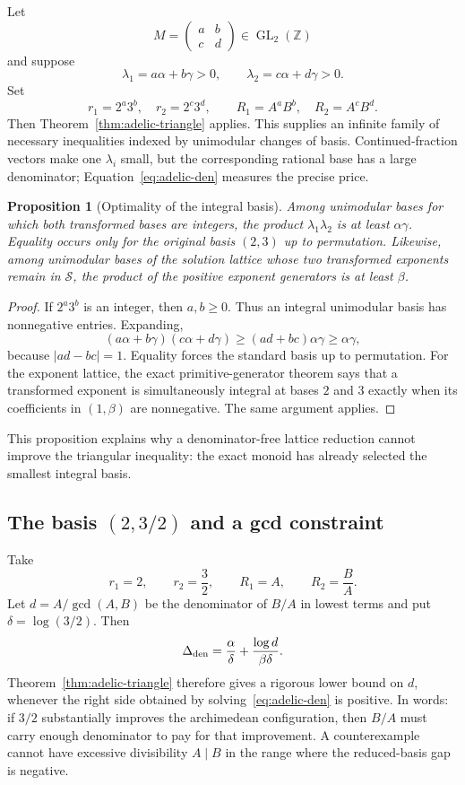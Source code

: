 \documentclass[11pt,oneside]{article}
\newtheorem{proposition}[theorem]{Proposition}
\theoremstyle{definition}
\theoremstyle{remark}
\newcommand{\Z}{\mathbb Z}
\begin{document}
Let
\[
 M=\begin{pmatrix}a&b\\c&d\end{pmatrix}\in\operatorname{GL}_2(\Z)
\]
and suppose
\[
 \lambda_1=a\alpha+b\gamma>0,\qquad
 \lambda_2=c\alpha+d\gamma>0.
\]
Set
\[
 r_1=2^a3^b,\quad r_2=2^c3^d,\qquad
 R_1=A^aB^b,\quad R_2=A^cB^d.
\]
Then Theorem~\ref{thm:adelic-triangle} applies.  This supplies an infinite
family of necessary inequalities indexed by unimodular changes of basis.
Continued-fraction vectors make one $\lambda_i$ small, but the corresponding
rational base has a large denominator; Equation~\eqref{eq:adelic-den} measures
the precise price.

\begin{proposition}[Optimality of the integral basis]\label{prop:integral-basis-opt}
Among unimodular bases for which both transformed bases are integers, the
product $\lambda_1\lambda_2$ is at least $\alpha\gamma$.  Equality occurs only
for the original basis $(2,3)$ up to permutation.  Likewise, among unimodular
bases of the solution lattice whose two transformed exponents remain in
$\mathcal S$, the product of the positive exponent generators is at least
$\beta$.
\end{proposition}
\begin{proof}
If $2^a3^b$ is an integer, then $a,b\ge0$.  Thus an integral unimodular basis
has nonnegative entries.  Expanding,
\[
 (a\alpha+b\gamma)(c\alpha+d\gamma)
 \ge(ad+bc)\alpha\gamma\ge\alpha\gamma,
\]
because $|ad-bc|=1$.  Equality forces the standard basis up to permutation.
For the exponent lattice, the exact primitive-generator theorem says that a transformed
exponent is simultaneously integral at bases $2$ and $3$ exactly when its
coefficients in $(1,\beta)$ are nonnegative.  The same argument applies.
\end{proof}

This proposition explains why a denominator-free lattice reduction cannot
improve the triangular inequality: the exact monoid has already selected the
smallest integral basis.

\subsection{The basis $(2,3/2)$ and a gcd constraint}

Take
\[
 r_1=2,\qquad r_2=\frac32,\qquad
 R_1=A,\qquad R_2=\frac BA.
\]
Let $d=A/\gcd(A,B)$ be the denominator of $B/A$ in lowest terms and put
$\delta=\log(3/2)$.  Then
\begin{equation}\label{eq:delta-32}
 \Delta_{\rm den}=\frac{\alpha}{\delta}
 +\frac{\log d}{\beta\delta}.
\end{equation}
Theorem~\ref{thm:adelic-triangle} therefore gives a rigorous lower bound on
$d$, whenever the right side obtained by solving~\eqref{eq:adelic-den} is
positive.  In words: if $3/2$ substantially improves the archimedean
configuration, then $B/A$ must carry enough denominator to pay for that
improvement.  A counterexample cannot have excessive divisibility
$A\mid B$ in the range where the reduced-basis gap is negative.
\end{document}
